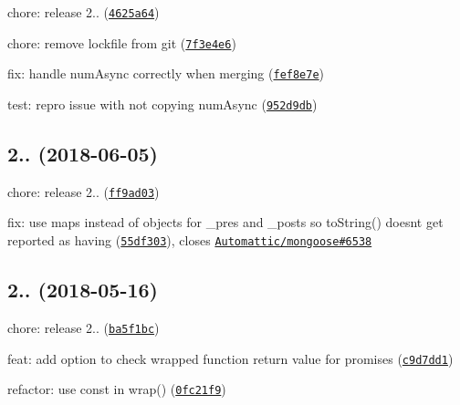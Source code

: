 \begin{DoxyItemize}
\item chore\+: release 2.. (\href{https://github.com/vkarpov15/kareem/commit/4625a64}{\tt 4625a64})
\item chore\+: remove lockfile from git (\href{https://github.com/vkarpov15/kareem/commit/7f3e4e6}{\tt 7f3e4e6})
\item fix\+: handle num\+Async correctly when merging (\href{https://github.com/vkarpov15/kareem/commit/fef8e7e}{\tt fef8e7e})
\item test\+: repro issue with not copying num\+Async (\href{https://github.com/vkarpov15/kareem/commit/952d9db}{\tt 952d9db})
\end{DoxyItemize}

\label{_2.2.0}%
 \subsection*{2.. (2018-\/06-\/05)}


\begin{DoxyItemize}
\item chore\+: release 2.. (\href{https://github.com/vkarpov15/kareem/commit/ff9ad03}{\tt ff9ad03})
\item fix\+: use maps instead of objects for \+\_\+pres and \+\_\+posts so {\ttfamily to\+String()} doesn\textquotesingle{}t get reported as having (\href{https://github.com/vkarpov15/kareem/commit/55df303}{\tt 55df303}), closes \href{https://github.com/Automattic/mongoose/issues/6538}{\tt Automattic/mongoose\#6538}
\end{DoxyItemize}

\label{_2.1.0}%
 \subsection*{2.. (2018-\/05-\/16)}


\begin{DoxyItemize}
\item chore\+: release 2.. (\href{https://github.com/vkarpov15/kareem/commit/ba5f1bc}{\tt ba5f1bc})
\item feat\+: add option to check wrapped function return value for promises (\href{https://github.com/vkarpov15/kareem/commit/c9d7dd1}{\tt c9d7dd1})
\item refactor\+: use const in wrap() (\href{https://github.com/vkarpov15/kareem/commit/0fc21f9}{\tt 0fc21f9})
\end{DoxyItemize}

